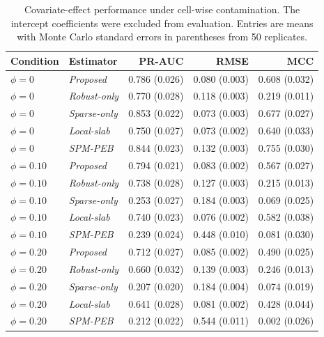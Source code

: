 \begin{table}[htbp]
\centering
\scriptsize
\setlength{\tabcolsep}{4pt}
\caption{Covariate-effect performance under cell-wise contamination. The intercept coefficients were excluded from evaluation. Entries are means with Monte Carlo standard errors in parentheses from 50 replicates.}
\label{tab:supp-covariate-contamination}
\begin{tabular}{llrrr}
\toprule
Condition & Estimator & PR-AUC & RMSE & MCC\\
\midrule 
$\phi=0$ & \emph{Proposed} & 0.786 (0.026) & 0.080 (0.003) & 0.608 (0.032)\\ 
$\phi=0$ & \emph{Robust-only} & 0.770 (0.028) & 0.118 (0.003) & 0.219 (0.011)\\ 
$\phi=0$ & \emph{Sparse-only} & 0.853 (0.022) & 0.073 (0.003) & 0.677 (0.027)\\ 
$\phi=0$ & \emph{Local-slab} & 0.750 (0.027) & 0.073 (0.002) & 0.640 (0.033)\\ 
$\phi=0$ & \emph{SPM-PEB} & 0.844 (0.023) & 0.132 (0.003) & 0.755 (0.030)\\ 
$\phi=0.10$ & \emph{Proposed} & 0.794 (0.021) & 0.083 (0.002) & 0.567 (0.027)\\ 
$\phi=0.10$ & \emph{Robust-only} & 0.738 (0.028) & 0.127 (0.003) & 0.215 (0.013)\\ 
$\phi=0.10$ & \emph{Sparse-only} & 0.253 (0.027) & 0.184 (0.003) & 0.069 (0.025)\\ 
$\phi=0.10$ & \emph{Local-slab} & 0.740 (0.023) & 0.076 (0.002) & 0.582 (0.038)\\ 
$\phi=0.10$ & \emph{SPM-PEB} & 0.239 (0.024) & 0.448 (0.010) & 0.081 (0.030)\\ 
$\phi=0.20$ & \emph{Proposed} & 0.712 (0.027) & 0.085 (0.002) & 0.490 (0.025)\\ 
$\phi=0.20$ & \emph{Robust-only} & 0.660 (0.032) & 0.139 (0.003) & 0.246 (0.013)\\ 
$\phi=0.20$ & \emph{Sparse-only} & 0.207 (0.020) & 0.184 (0.004) & 0.074 (0.019)\\ 
$\phi=0.20$ & \emph{Local-slab} & 0.641 (0.028) & 0.081 (0.002) & 0.428 (0.044)\\ 
$\phi=0.20$ & \emph{SPM-PEB} & 0.212 (0.022) & 0.544 (0.011) & 0.002 (0.026)\\ 
\bottomrule
\end{tabular}
\end{table}
 
